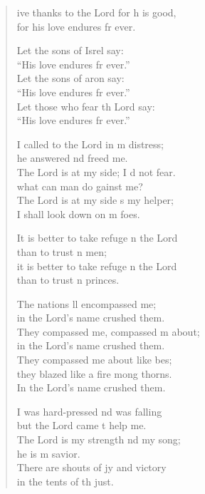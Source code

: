 \settowidth{\versewidth}{I shall not die, I shall live and recount his deeds.}
\begin{verse}%
  \begin{patverse}
    ive thanks to the Lord for h is good,\Med\\
    for his love endures fr ever.

    Let the sons of Isrel say:\Med\\
    “His love endures fr ever.”\\
    Let the sons of aron say:\Med\\
    “His love endures fr ever.”\\
    Let those who fear th Lord say:\Med\\
    “His love endures fr ever.”

    I called to the Lord in m distress;\Med\\
    he answered nd freed me.\\
    The Lord is at my side; I d not fear.\Med\\
    what can man do gainst me?\\
    The Lord is at my side s my helper;\Med\\
    I shall look down on m foes.

    It is better to take refuge \pointup{\i}n the Lord\Med\\
    than to trust \pointup{\i}n men;\\
    it is better to take refuge \pointup{\i}n the Lord\Med\\
    than to trust \pointup{\i}n princes.

    The nations ll encompassed me;\Med\\
    in the Lord’s name  crushed them.\\
    They compassed me, compassed m about;\Med\\
    in the Lord’s name  crushed them.\\
    They compassed me about like bes;\Flex\\
    they blazed like a fire mong thorns.\Med\\
    In the Lord’s name  crushed them.

    I was hard-pressed nd was falling\Med\\
    but the Lord came t help me.\\
    The Lord is my strength nd my song;\Med\\
    he is m savior.\\
    There are shouts of jy and victory\Med\\
    in the tents of th just.


\end{patverse}
\end{verse}
